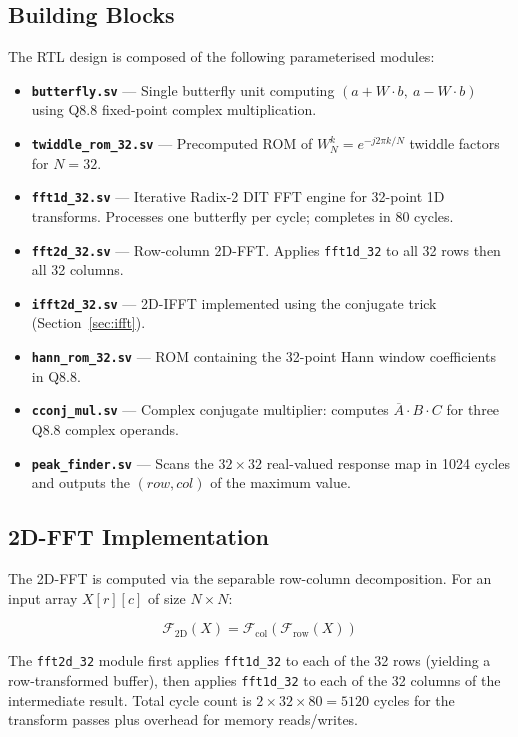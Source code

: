 \documentclass[a4paper,12pt]{report}
\begin{document}
\subsection{Building Blocks}

The RTL design is composed of the following parameterised modules:

\begin{itemize}
    \item \textbf{\texttt{butterfly.sv}} --- Single butterfly unit computing $(a + W \cdot b,\ a - W \cdot b)$ using Q8.8 fixed-point complex multiplication.
    \item \textbf{\texttt{twiddle\_rom\_32.sv}} --- Precomputed ROM of $W_N^k = e^{-j2\pi k/N}$ twiddle factors for $N=32$.
    \item \textbf{\texttt{fft1d\_32.sv}} --- Iterative Radix-2 DIT FFT engine for 32-point 1D transforms. Processes one butterfly per cycle; completes in 80 cycles.
    \item \textbf{\texttt{fft2d\_32.sv}} --- Row-column 2D-FFT. Applies \texttt{fft1d\_32} to all 32 rows then all 32 columns.
    \item \textbf{\texttt{ifft2d\_32.sv}} --- 2D-IFFT implemented using the conjugate trick (Section~\ref{sec:ifft}).
    \item \textbf{\texttt{hann\_rom\_32.sv}} --- ROM containing the 32-point Hann window coefficients in Q8.8.
    \item \textbf{\texttt{cconj\_mul.sv}} --- Complex conjugate multiplier: computes $\overline{A} \cdot B \cdot C$ for three Q8.8 complex operands.
    \item \textbf{\texttt{peak\_finder.sv}} --- Scans the $32\times32$ real-valued response map in 1024 cycles and outputs the $(row, col)$ of the maximum value.
\end{itemize}

\subsection{2D-FFT Implementation}

The 2D-FFT is computed via the separable row-column decomposition. For an input array $X[r][c]$ of size $N \times N$:

\begin{equation}
\mathcal{F}_\text{2D}(X) = \mathcal{F}_\text{col}\!\left(\mathcal{F}_\text{row}(X)\right)
\end{equation}

\noindent The \texttt{fft2d\_32} module first applies \texttt{fft1d\_32} to each of the 32 rows (yielding a row-transformed buffer), then applies \texttt{fft1d\_32} to each of the 32 columns of the intermediate result. Total cycle count is $2 \times 32 \times 80 = 5120$ cycles for the transform passes plus overhead for memory reads/writes.
\end{document}
